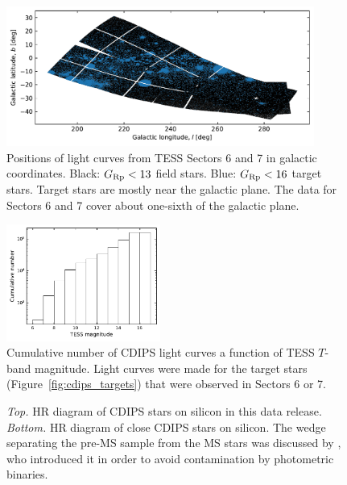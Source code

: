 \documentclass[12pt,twocolumn,tighten]{aastex62}
\begin{document}
\begin{figure}[!t]
	\begin{center}
		\leavevmode
		\includegraphics[width=0.9\textwidth]{galacticcoords_cluster_field_star_positions.pdf}
	\end{center}
	\vspace{-0.7cm}
	\caption{
    Positions of light curves from TESS Sectors 6 and 7 in galactic
    coordinates.  Black: $G_{\rm Rp}<13$ field stars.  Blue: $G_{\rm
    Rp}<16$ target stars.  Target stars are mostly near the galactic
    plane. The data for Sectors 6 and 7 cover about one-sixth of the
    galactic plane.
		\label{fig:lcgalactic}
	}
\end{figure}

\begin{figure}[!t]
	\begin{center}
		\leavevmode
		\includegraphics[width=0.45\textwidth]{cdf_T_mag.pdf}
	\end{center}
	\vspace{-0.5cm}
	\caption{
    Cumulative number of CDIPS light curves a function of TESS
    $T$-band magnitude.  Light curves were made for the target stars
    (Figure~\ref{fig:cdips_targets}) that were observed in Sectors 6
    or 7.
		\label{fig:cdf_T_mag}
	}
\end{figure}

\begin{figure}[!ht]
	\vspace{-1.1cm}
	\vspace{-0.9cm}
	\caption{
    {\it Top.} HR diagram of CDIPS stars on silicon in this data
    release.  {\it Bottom.} HR diagram of close CDIPS stars on
    silicon. The wedge separating the pre-MS sample from the MS stars
    was discussed by \citet{zari_3d_2018}, who introduced it in order
    to avoid contamination by photometric binaries.
	}
	\label{fig:hrd}
\end{figure}
\end{document}
